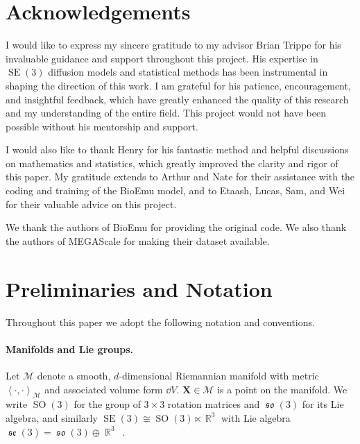 \documentclass{article}
\theoremstyle{plain}
\theoremstyle{definition}
\theoremstyle{remark}
\DeclareMathOperator{\SE}{SE}
\DeclareMathOperator{\SO}{SO}
\DeclareMathOperator{\se}{\mathfrak{se}}
\DeclareMathOperator{\so}{\mathfrak{so}}
\DeclareMathOperator{\R}{\mathbb{R}}
\newcommand{\inner}[2]{\left\langle #1, #2\right\rangle}
\begin{document}
\section*{Acknowledgements}

I would like to express my sincere gratitude to my advisor Brian Trippe for his invaluable guidance and support throughout this project. His expertise in $\SE(3)$ diffusion models and statistical methods has been instrumental in shaping the direction of this work. I am grateful for his patience, encouragement, and insightful feedback, which have greatly enhanced the quality of this research and my understanding of the entire field. This project would not have been possible without his mentorship and support.

I would also like to thank Henry for his fantastic method and helpful discussions on mathematics and statistics, which greatly improved the clarity and rigor of this paper. My gratitude extends to Arthur and Nate for their assistance with the coding and training of the BioEmu model, and to Etaash, Lucas, Sam, and Wei for their valuable advice on this project.

We thank the authors of BioEmu for providing the original code. We also thank the authors of MEGAScale for making their dataset available.






\newpage
\appendix
\onecolumn

\section{Preliminaries and Notation}

Throughout this paper we adopt the following notation and conventions.

\paragraph{Manifolds and Lie groups.}
Let $\mathcal{M}$ denote a smooth, $d$-dimensional Riemannian manifold with metric $\inner{\cdot}{\cdot}_{\mathcal{M}}$ and associated volume form $\dd V$. $\mathbf{X} \in \mathcal{M}$ is a point on the manifold. We write $\SO(3)$ for the group of $3\times3$ rotation matrices and $\so(3)$ for its Lie algebra, and similarly $\SE(3)\cong\SO(3)\ltimes\R^3$ with Lie algebra $\se(3)=\so(3)\oplus\R^3$~\cite{micro_lie_theory}.
\end{document}
